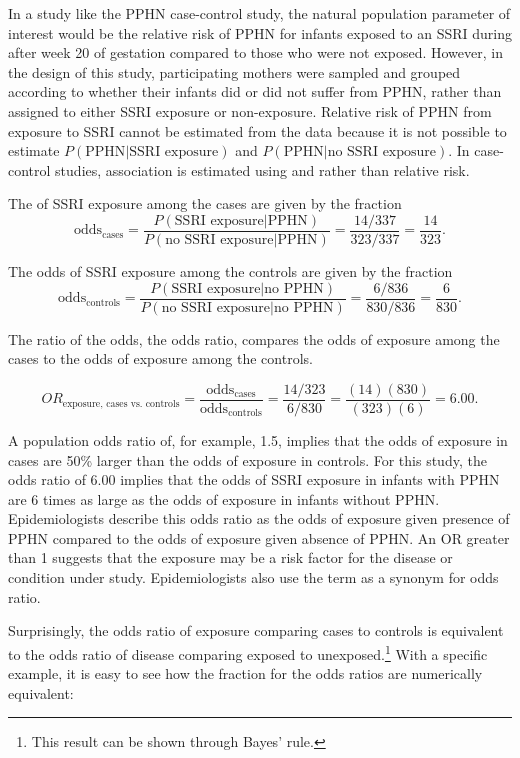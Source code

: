 In a study like the PPHN case-control study, the natural population parameter of interest would be the relative risk of PPHN for infants exposed to an SSRI during after week 20 of gestation compared to those who were not exposed. However, in the design of this study, participating mothers were sampled and grouped according to whether their infants did or did not suffer from PPHN, rather than assigned to either SSRI exposure or non-exposure. Relative risk of PPHN from exposure to SSRI cannot be estimated from the data because it is not possible to estimate $P(\text{PPHN} | \text{SSRI exposure})$ and $P(\text{PPHN} | \text{no SSRI exposure})$. In case-control studies, association is estimated using  and  rather than relative risk.

The  of SSRI exposure among the cases are given by the fraction
\[
  \text{odds$_\text{cases}$} = \frac{P(\text{SSRI exposure} | \text{PPHN})}
  {P(\text{no SSRI exposure} | \text{PPHN})} = \frac{14/337}{323/337} = \frac{14}{323}.
\]

The odds of SSRI exposure among the controls are given by the fraction
\[
  \text{odds$_\text{controls}$} = \frac{P(\text{SSRI exposure} | \text{no PPHN})}
  {P(\text{no SSRI exposure} | \text{no PPHN})} = \frac{6/836}{830/836} = \frac{6}{830}.
\]

The ratio of the odds, the odds ratio, compares the odds of exposure among the cases to the odds of exposure among the controls. 

\[OR_{\text{exposure, cases vs. controls}} = \frac{\text{odds$_\text{cases}$}}{\text{odds$_\text{controls}$}} = \frac{14/323}{6/830} = \frac{(14)(830)}{(323)(6)} =  6.00. \]

\textD{\newpage}

A population odds ratio of, for example, 1.5, implies that the odds of exposure in cases are 50\% larger than the odds of exposure in controls. For this study, the odds ratio of 6.00 implies that the odds of SSRI exposure in infants with PPHN are 6 times as large as the odds of exposure in infants without PPHN. Epidemiologists describe this odds ratio as the odds of exposure given presence of PPHN compared to the odds of exposure given absence of PPHN. An OR greater than 1 suggests that the exposure may be a risk factor for the disease or condition under study.  Epidemiologists also use the term  as a synonym for odds ratio.

Surprisingly, the odds ratio of exposure comparing cases to controls is equivalent to the odds ratio of disease comparing exposed to unexposed.\footnote{This result can be shown through Bayes' rule.} With a specific example, it is easy to see how the fraction for the odds ratios are numerically equivalent:

